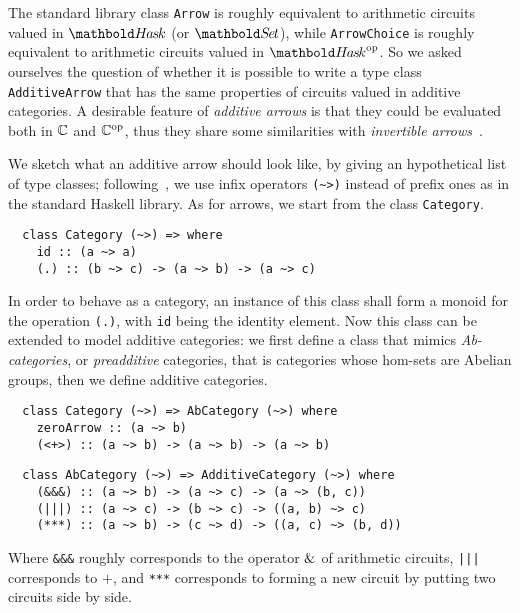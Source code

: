 The standard library class \lstinline+Arrow+ is roughly equivalent to
arithmetic circuits valued in $\Hask$ (or $\Set$),
while \lstinline+ArrowChoice+ is roughly equivalent to arithmetic
circuits valued in $\Hask^\op$. So we asked ourselves the
question of whether it is possible to write a type class
\lstinline+AdditiveArrow+ that has the same properties of circuits
valued in additive categories. A desirable feature of \emph{additive
  arrows} is that they could be evaluated both in $\mathbb{C}$ and $\mathbb{C}^{\mathrm{op}}$,
thus they share some similarities with \emph{invertible
  arrows}~\cite{alimarine+al:invertible-arrows}.

We sketch what an additive arrow should look like, by giving an
hypothetical list of type classes;
following~\cite{yorgey:typeclassopedia}, we use infix operators
\lstinline+(~>)+ instead of prefix ones as in the standard Haskell
library.  As for arrows, we start from the class \lstinline+Category+.

\begin{lstlisting}
  class Category (~>) => where
    id :: (a ~> a)
    (.) :: (b ~> c) -> (a ~> b) -> (a ~> c)
\end{lstlisting}

In order to behave as a category, an instance of this class shall form
a monoid for the operation \lstinline+(.)+, with \lstinline+id+ being
the identity element. Now this class can be extended to model additive
categories: we first define a class that mimics \emph{Ab-categories},
or \emph{preadditive} categories, that is categories whose hom-sets
are Abelian groups, then we define additive categories.

\begin{lstlisting}
  class Category (~>) => AbCategory (~>) where
    zeroArrow :: (a ~> b)
    (<+>) :: (a ~> b) -> (a ~> b) -> (a ~> b)
\end{lstlisting}

\begin{lstlisting}
  class AbCategory (~>) => AdditiveCategory (~>) where
    (&&&) :: (a ~> b) -> (a ~> c) -> (a ~> (b, c))
    (|||) :: (a ~> c) -> (b ~> c) -> ((a, b) ~> c)
    (***) :: (a ~> b) -> (c ~> d) -> ((a, c) ~> (b, d))
\end{lstlisting}

Where \lstinline+&&&+ roughly corresponds to the operator $\operatorname{\&}$ of
arithmetic circuits, \lstinline+|||+ corresponds to $+$, and
\lstinline+***+ corresponds to forming a new circuit by putting two
circuits side by side.

